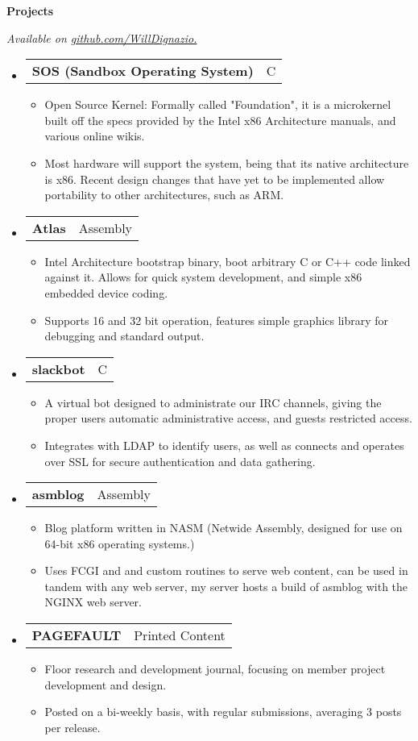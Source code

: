 \documentclass[letterpaper,11pt]{article}
\makeatletter
\newcommand{\resheading}[1]{{\large \colorbox{mygrey}{\begin{minipage}{\textwidth}{\textbf{#1 \vphantom{p\^{E}}}}\end{minipage}}}}
\newcommand{\restwosubheading}[2]{
\begin{tabular*}{6.5in}{l@{\extracolsep{\fill}}r}
		\textbf{#1} & #2 \\
\end{tabular*}\vspace{-6pt}}
\makeatother
\begin{document}
\resheading{Projects}
{ \footnotesize
	\textit{Available on {\href{http://www.github.com/WillDignazio/}{github.com/WillDignazio.}}}
	\begin{itemize}
		\item 
		\restwosubheading{SOS (Sandbox Operating System) }{C}
			\begin{itemize}
				\item{Open Source Kernel: Formally called "Foundation", it is a microkernel built off the specs provided by the Intel x86 Architecture manuals, and various online wikis.}
				\item{Most hardware will support the system, being that its native architecture is x86. Recent design changes that have yet to be implemented allow portability to other architectures, such as ARM.}
			\end{itemize}
		\item		
		\restwosubheading{Atlas}{Assembly}
			\begin{itemize}
				\item{Intel Architecture bootstrap binary, boot arbitrary C or C++ code linked against it. Allows for quick system development, and simple x86 embedded device coding.} 
				\item{Supports 16 and 32 bit operation, features simple graphics library for debugging and standard output.}
			\end{itemize}
		\item
		\restwosubheading{slackbot}{C}
			\begin{itemize}
				\item{A virtual bot designed to administrate our IRC channels, giving the proper users automatic administrative access, and guests restricted access.}
				\item{Integrates with LDAP to identify users, as well as connects and operates over SSL for secure authentication and data gathering.}
			\end{itemize}
		\item		
		\restwosubheading{asmblog}{Assembly}
			\begin{itemize}
				\item{Blog platform written in NASM (Netwide Assembly, designed for use on 64-bit x86 operating systems.)}
				\item{Uses FCGI and and custom routines to serve web content, can be used in tandem with any web server, my server hosts a build of asmblog with the NGINX web server.}
			\end{itemize}
		\item
		\restwosubheading{PAGEFAULT}{Printed Content}
			\begin{itemize}
				\item{Floor research and development journal, focusing on member project development and design.}
				\item{Posted on a bi-weekly basis, with regular submissions, averaging 3 posts per release.}
			\end{itemize}
	\end{itemize}
}

\end{document}
